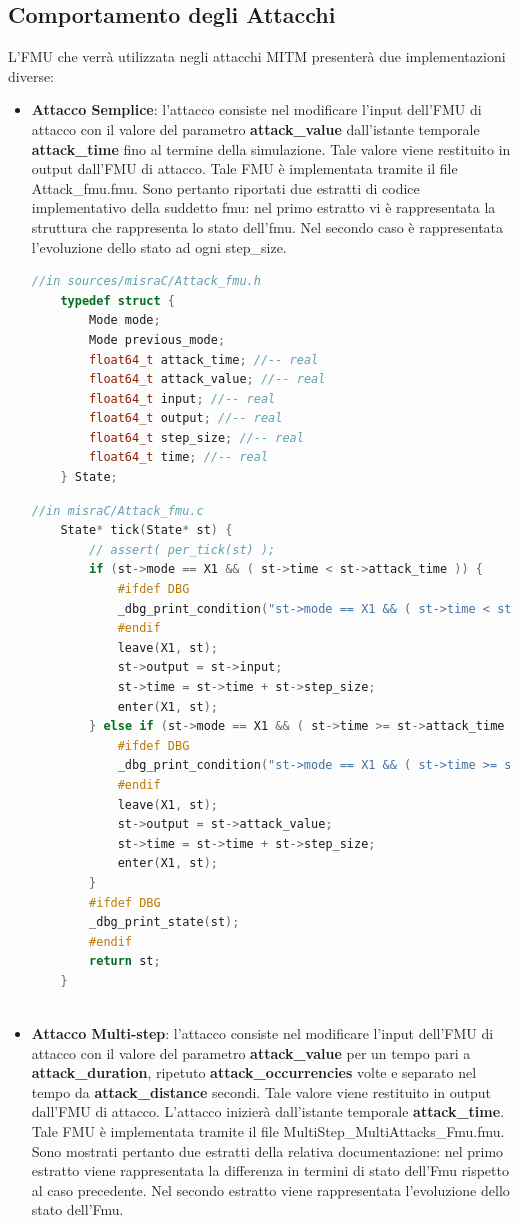 \subsection{Comportamento degli Attacchi}
L'FMU che verrà utilizzata negli attacchi MITM presenterà due implementazioni diverse:
\begin{itemize}
\item \textbf{Attacco Semplice}: l'attacco consiste nel modificare l'input dell'FMU di attacco con il valore del parametro \textbf{attack\_value} dall'istante temporale \textbf{attack\_time} fino al termine della simulazione. Tale valore viene restituito in output dall'FMU di attacco. Tale FMU è implementata tramite il file Attack\_fmu.fmu. Sono pertanto riportati due estratti di codice implementativo della suddetto fmu: nel primo estratto vi è rappresentata la struttura che rappresenta lo stato dell'fmu. Nel secondo caso è rappresentata l'evoluzione dello stato ad ogni step\_size.

\begin{lstlisting}[language=C++]
	//in sources/misraC/Attack_fmu.h
	typedef struct { 
		Mode mode;
		Mode previous_mode;
		float64_t attack_time; //-- real
		float64_t attack_value; //-- real
		float64_t input; //-- real
		float64_t output; //-- real
		float64_t step_size; //-- real
		float64_t time; //-- real
	} State;

\end{lstlisting}
\begin{lstlisting}[language=C++]
	//in misraC/Attack_fmu.c
	State* tick(State* st) {
		// assert( per_tick(st) );
		if (st->mode == X1 && ( st->time < st->attack_time )) {
			#ifdef DBG
			_dbg_print_condition("st->mode == X1 && ( st->time < st->attack_time )");
			#endif
			leave(X1, st);
			st->output = st->input;
			st->time = st->time + st->step_size;
			enter(X1, st);
		} else if (st->mode == X1 && ( st->time >= st->attack_time )) {
			#ifdef DBG
			_dbg_print_condition("st->mode == X1 && ( st->time >= st->attack_time )");
			#endif
			leave(X1, st);
			st->output = st->attack_value;
			st->time = st->time + st->step_size;
			enter(X1, st);
		}
		#ifdef DBG
		_dbg_print_state(st);
		#endif
		return st;
	}
	
\end{lstlisting}

\item \textbf{Attacco Multi-step}: l'attacco consiste nel modificare l'input dell'FMU di attacco con il valore del parametro \textbf{attack\_value} per un tempo pari a \textbf{attack\_duration}, ripetuto \textbf{attack\_occurrencies} volte e separato nel tempo da \textbf{attack\_distance} secondi. Tale valore viene restituito in output dall'FMU di attacco. L'attacco inizierà dall'istante temporale \textbf{attack\_time}. Tale FMU è implementata tramite il file MultiStep\_MultiAttacks\_Fmu.fmu. Sono mostrati pertanto due estratti della relativa documentazione: nel primo estratto viene rappresentata la differenza in termini di stato dell'Fmu rispetto al caso precedente. Nel secondo estratto viene rappresentata l'evoluzione dello stato dell'Fmu.

\end{itemize}

